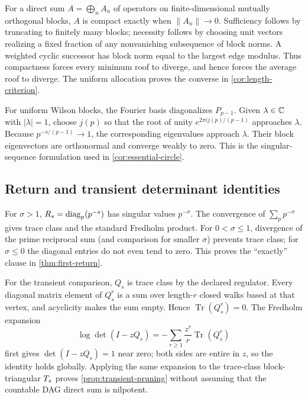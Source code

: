 For a direct sum $A=\bigoplus_n A_n$ of operators on finite-dimensional
mutually orthogonal blocks, $A$ is compact exactly when
$\|A_n\|\to0$.  Sufficiency follows by truncating to finitely many blocks;
necessity follows by choosing unit vectors realizing a fixed fraction of any
nonvanishing subsequence of block norms.  A weighted cyclic successor has
block norm equal to the largest edge modulus.  Thus compactness forces every
minimum roof to diverge, and hence forces the average roof to diverge.  The
uniform allocation proves the converse in \cref{cor:length-criterion}.

For uniform Wilson blocks, the Fourier basis diagonalizes $P_{p-1}$.  Given
$\lambda\in\mathbb C$ with $|\lambda|=1$, choose $j(p)$ so that the root of unity
$e^{2\pi i j(p)/(p-1)}$ approaches $\lambda$.  Because
$p^{-s/(p-1)}\to1$, the corresponding eigenvalues approach $\lambda$.
Their block eigenvectors are orthonormal and converge weakly to zero.  This
is the singular-sequence formulation used in
\cref{cor:essential-circle}.

\subsection{Return and transient determinant identities}

For $\sigma>1$, $R_s=\operatorname{diag}_p(p^{-s})$ has singular values $p^{-\sigma}$.
The convergence of $\sum_p p^{-\sigma}$ gives trace class and the standard
Fredholm product.  For $0<\sigma\leq1$, divergence of the prime reciprocal
sum (and comparison for smaller $\sigma$) prevents trace class; for
$\sigma\leq0$ the diagonal entries do not even tend to zero.  This proves the
``exactly'' clause in \cref{thm:first-return}.

For the transient comparison, $Q_s$ is trace class by the declared regulator.
Every diagonal matrix element of $Q_s^r$ is a sum over length-$r$ closed
walks based at that vertex, and acyclicity makes the sum empty.  Hence
$\operatorname{Tr}(Q_s^r)=0$.  The Fredholm expansion
\[
  \log\det(I-zQ_s)
  =-\sum_{r\geq1}\frac{z^r}{r}\operatorname{Tr}(Q_s^r)
\]
first gives $\det(I-zQ_s)=1$ near zero; both sides are entire in $z$, so the
identity holds globally.  Applying the same expansion to the trace-class
block-triangular $T_s$ proves \cref{prop:transient-pruning} without assuming
that the countable DAG direct sum is nilpotent.
